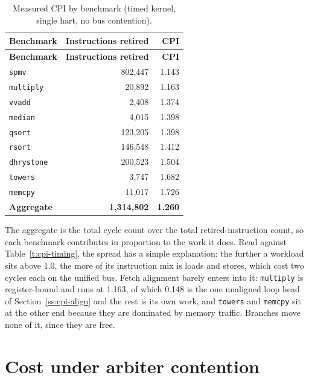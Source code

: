 \documentclass[11pt,pdftex,openany,letterpaper]{report}
\begin{document}
\begin{longtable}[c]{ l r r }
\caption{Measured CPI by benchmark (timed kernel, single hart, no bus contention).} \label{t:cpi-bench} \\
\hline \textbf{Benchmark} & \textbf{Instructions retired} & \textbf{CPI} \\ \hline \endfirsthead
\hline \textbf{Benchmark} & \textbf{Instructions retired} & \textbf{CPI} \\ \hline \endhead
                               \texttt{spmv}      & 802{,}447 & 1.143 \\
\rowcolor{tablehighlightcolor} \texttt{multiply}  & 20{,}892  & 1.163 \\
                               \texttt{vvadd}     & 2{,}408   & 1.374 \\
\rowcolor{tablehighlightcolor} \texttt{median}    & 4{,}015   & 1.398 \\
                               \texttt{qsort}     & 123{,}205 & 1.398 \\
\rowcolor{tablehighlightcolor} \texttt{rsort}     & 146{,}548 & 1.412 \\
                               \texttt{dhrystone} & 200{,}523 & 1.504 \\
\rowcolor{tablehighlightcolor} \texttt{towers}    & 3{,}747   & 1.682 \\
                               \texttt{memcpy}    & 11{,}017  & 1.726 \\
\hline
\rowcolor{tablehighlightcolor} \textbf{Aggregate} & \textbf{1{,}314{,}802} & \textbf{1.260} \\
\hline
\end{longtable}

The aggregate is the total cycle count over the total retired-instruction count, so each benchmark contributes in proportion to the work it does. Read against Table~\ref{t:cpi-timing}, the spread has a simple explanation: the further a workload sits above 1.0, the more of its instruction mix is loads and stores, which cost two cycles each on the unified bus. Fetch alignment barely enters into it: \texttt{multiply} is register-bound and runs at 1.163, of which 0.148 is the one unaligned loop head of Section~\ref{ss:cpi-align} and the rest is its own work, and \texttt{towers} and \texttt{memcpy} sit at the other end because they are dominated by memory traffic. Branches move none of it, since they are free.

\ifnum{}
\section{Cost under arbiter contention} \label{ss:cpi-contention}
\end{document}
